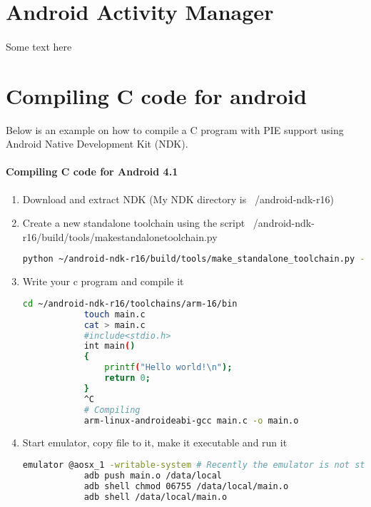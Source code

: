 \documentclass[../main.tex]{subfile}
\begin{document}
	\begin{appendices}
		\section{Android Activity Manager}
		\label{app::android_am}
			\paragraph{} Some text here
		
		\section{Compiling C code for android}
		Below is an example on how to compile a C program with PIE support using Android Native Development Kit (NDK).
		\paragraph{Compiling C code for Android 4.1}
		\begin{enumerate}
			\item Download and extract NDK (My NDK directory is ~/android-ndk-r16)
			\item Create a new standalone toolchain using the script ~/android-ndk-r16/build/tools/make\textunderscore standalone\textunderscore toolchain.py
			\begin{lstlisting}[language=bash]
				python ~/android-ndk-r16/build/tools/make_standalone_toolchain.py --arch arm --api 16 --install-dir ~/android-ndk-r16/toolchains/arm-16
			\end{lstlisting}
			\item Write your c program and compile it
			\begin{lstlisting}[language=bash]
			cd ~/android-ndk-r16/toolchains/arm-16/bin
			touch main.c
			cat > main.c
			#include<stdio.h>
			int main()
			{
				printf("Hello world!\n");
				return 0;
			}
			^C
			# Compiling
			arm-linux-androideabi-gcc main.c -o main.o
			\end{lstlisting}
			
			\item Start emulator, copy file to it, make it executable and run it
			
			\begin{lstlisting}[language=bash]
			emulator @aosx_1 -writable-system # Recently the emulator is not starting without writable, check if yours do
			adb push main.o /data/local
			adb shell chmod 06755 /data/local/main.o
			adb shell /data/local/main.o
			

\end{lstlisting}
\end{enumerate}
\end{appendices}
\end{document}
